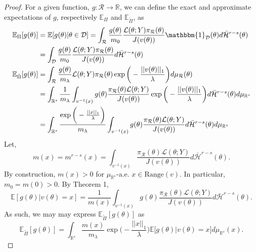 \documentclass[10pt,fleqn]{article}
\newcommand{\bb}[1]{\mathbb{#1}} \newcommand{\mc}[1]{\mathcal{#1}}
\DeclareMathOperator{\1}{\mathbbm{1}} \DeclareMathOperator{\bigO}{\mc O}
\begin{document}
\begin{proof}
For a given function, $g:\mathcal{R}\to\mathbb{R}$, we can define the exact and approximate expectations of $g$, respectively $\bb E_\Pi$ and $\bb E_{\tilde{\Pi}}$, as
\begin{align*}
\bb E_\Pi[g(\theta)] &= \bb E[g(\theta)|\theta\in\mathcal{D}] = \int_\mathcal{R} \frac{g(\theta)}{m_0} \frac{\mathcal{L}(\theta;Y)\pi_\mathcal{R}(\theta)}{J(v(\theta))}\mathbbm{1}_\mathcal{D}(\theta)d\bar{\mathcal{H}}^{r-s}(\theta) \\
&=\int_\mathcal{D} \frac{g(\theta)}{m_0} \frac{\mathcal{L}(\theta;Y)\pi_\mathcal{R}(\theta)}{J(v(\theta))}d\bar{\mathcal{H}}^{r-s}(\theta)\\
\bb E_{\tilde{\Pi}}[g(\theta)] &= \int_\mathcal{R}  \frac{g(\theta)}{m_\lambda} \mathcal{L}(\theta;Y)\pi_\mathcal{R}(\theta)\exp\bigg(-\frac{||v(\theta)||_1}{\lambda}\bigg)d\mu_\mathcal{R}(\theta) \\
&= \int_{\mathbb{R}^s} \frac{1}{m_\lambda} \int_{v^{-1}(x)} g(\theta) \frac{\pi_\mathcal{R}(\theta)\mathcal{L}(\theta;Y)}{J(v(\theta))} \exp\bigg(-\frac{||v(\theta)||_1}{\lambda}\bigg) d\bar{\mathcal{H}}^{r-s}(\theta) d\mu_{\mathbb{R}^s} \\
&=\int_{\mathbb{R}^s} \frac{\exp\bigg(-\frac{||x||_1}{\lambda}\bigg) }{m_\lambda} \int_{v^{-1}(x)} g(\theta) \frac{\pi_\mathcal{R}(\theta)\mathcal{L}(\theta;Y)}{J(v(\theta))} d\bar{\mathcal{H}}^{r-s}(\theta) d\mu_{\mathbb{R}^s} 
\end{align*}
Let, $$m(x) = m^{r-s}(x) = \int_{v^{-1}(x)}\frac{\pi_\mathcal{R}(\theta)\mathcal{L}(\theta;Y)}{J(v(\theta))} d\bar{\mathcal{H}}^{r-s}(\theta) .$$
By construction, $m(x) > 0$ for $\mu_{\mathbb{R}^s}$-a.e. $x\in \text{Range}(v)$. In particular, $m_0=m(0)>0$. By Theorem 1,
\begin{equation}
\bb E[g(\theta) | v(\theta) = x] = \frac{1}{m(x)} \int_{v^{-1}(x)} g(\theta)\frac{\pi_\mathcal{R}(\theta)\mathcal{L}(\theta;Y)}{J(v(\theta))} d\bar{\mathcal{H}}^{r-s}(\theta).
\end{equation}
As such, we may may express $\bb E_{\tilde{\Pi}}[g(\theta)]$ as 
\begin{equation}
\bb E_{\tilde{\Pi}}[g(\theta)] = \int_{\mathbb{R}^s} \frac{m(x)}{m_\lambda}\exp\bigg(-\frac{||x||_1}{\lambda}\bigg) \bb E\big[g(\theta)|v(\theta)=x\big] d\mu_{\mathbb{R}^s}(x).
\end{equation}


\end{proof}
\end{document}
